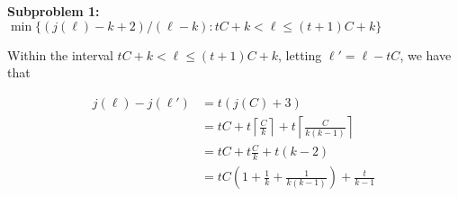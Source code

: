 \documentclass{article}
\theoremstyle{definition}
\newcommand{\hide}[1]{}
\newcommand{\edit}[1]{\textcolor{red}{#1}}
\newcommand{\zh}[1]{\textcolor{blue}{zh: #1}}
\begin{document}
\vspace{1.75em}
\textbf{Subproblem 1:} $\min \{(j(\ell)-k+2)/(\ell-k) : tC+k <\ell\leq  (t+1)C+k\}$ 

\hide{
This case comes naturally from Farey addition, which is defined as $\frac{a}{b} \oplus \frac{c}{d} = \frac{a+c}{b+d}$. A known fact is that if $\frac{a}{b}< \frac{c}{d}$ for nonnegative integers $a$ and $c$ and positive integers $b$ and $d$, then $\frac{a}{b} < \frac{a}{b} \oplus \frac{c}{d} < \frac{c}{d}$. We also have that $\oplus$ is commutative and associative.

 It is also the case that $\oplus$ satisfies a form of cancelation. Specifically, if $\frac{a}{b} < \frac{c}{d}$ for positive integers $a,b,c,d$, then $\frac{a'}{b'} \oplus \frac{c}{d} < \frac{a}{b} \oplus \frac{c}{d}$, if $ \frac{a'}{b'} < \frac{a}{b}$, $a' > a$ and $b'  > b$. (this can be derived by letting $\frac{a'}{b'} = \frac{(1+\epsilon_1) a}{(1+\epsilon_1 +\epsilon_2) b }$ with $0 < \epsilon_1, \epsilon_2 $, which means $\frac{a'}{b'} \oplus \frac{c}{d} = \frac{0}{\epsilon_2 b} \oplus \left(\frac{\epsilon_1a }{\epsilon_1b} \oplus \left( \frac{a}{b}\oplus \frac{c}{d}\right)\right)$, and noting that the terms are decreasing right-to-left)\edit{ need to explain better; technically does not state that $\frac{a'}{b'} = \frac{a}{b}$ gives the same result, even though this is also implied, by forgetting about the $\frac{0}{b\epsilon_2}$ part}

We then have by the definition of $j(\ell)$, that $ \frac{j(\ell)-(k-1)+1}{\ell -k} = \frac{j(\ell-a_t) +3+j(a_t)-(k-1)+1}{(\ell-a_t) +a_t -k} = \frac{j(\ell-a_t)+3}{\ell-a_t} \oplus \frac{j(a_t)-(k-1)+1}{a_t-k}$, where the second term is constant, and $\ell-a_t = \ell'$ is in the interval, $k < \ell' \leq k(k-1)(k-2)$. Then, we simply confirm that $\frac{c}{d} = \min_{k <\ell'\leq k(k-1)(k-2)} \{ \frac{j(\ell')+3}{\ell'} \}$ is achieved when $\ell' = k(k-1)(k-2)$, and that $\frac{j(a_t) -(k-1)+1}{a_t-k} > \frac{c}{d}$.\edit{ using $\frac{c}{d}$ is unpleasant}\zh{ gotta make sure I split the Farey addition properly!}

\edit{explain why last two claims are true}}

Within the interval $tC+k< \ell \leq (t+1)C+k$, letting $\ell' = \ell-tC$, we have that

\begin{align*}
    j(\ell) -j(\ell')&= t(j(C)+3) \\
    &= tC + t\left\lceil\frac{C}{k}\right\rceil +t\left\lceil\frac{C}{k(k-1)}\right\rceil  \\
    &= tC + t\frac{C}{k} + t(k-2)\\
    &= tC\left(1 + \frac{1}{k}+\frac{1}{k(k-1)}\right) +\frac{t}{k-1}\\
\end{align*}
\end{document}
